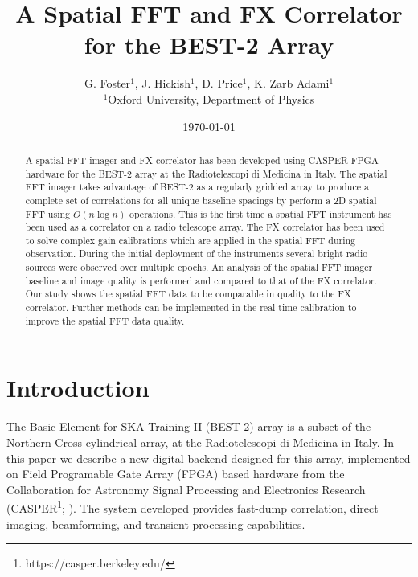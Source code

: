 \documentclass[useAMS,macros,usenatbib,onecolumn]{mn2e}
\title[]{A Spatial FFT and FX Correlator for the BEST-2 Array}
\author[G. Foster, J. Hickish, D. Price and K. Zarb Adami]{G. Foster$^{1}$, J. Hickish$^{1}$, D. Price$^{1}$, K. Zarb Adami$^{1}$\\
$^{1}$Oxford University, Department of Physics}
\begin{document}
\date{\today}

\pagerange{\pageref{firstpage}--\pageref{lastpage}} 

\maketitle

\begin{abstract}
A spatial FFT imager and FX correlator has been developed using CASPER FPGA hardware for the BEST-2 array at the Radiotelescopi di Medicina in Italy.
The spatial FFT imager takes advantage of BEST-2 as a regularly gridded array to produce a complete set of correlations for all unique baseline spacings by perform a 2D spatial FFT using $O(n \log n)$ operations.
This is the first time a spatial FFT instrument has been used as a correlator on a radio telescope array.
The FX correlator has been used to solve complex gain calibrations which are applied in the spatial FFT during observation.
During the initial deployment of the instruments several bright radio sources were observed over multiple epochs.
An analysis of the spatial FFT imager baseline and image quality is performed and compared to that of the FX correlator.
Our study shows the spatial FFT data to be comparable in quality to the FX correlator.
Further methods can be implemented in the real time calibration to improve the spatial FFT data quality.
\end{abstract}

\section{Introduction}

The Basic Element for SKA Training II (BEST-2) array is a subset of the Northern Cross cylindrical array, at the Radiotelescopi di Medicina in Italy.
In this paper we describe a new digital backend designed for this array, implemented on Field Programable Gate Array (FPGA) based hardware from the Collaboration for Astronomy Signal Processing and Electronics Research (CASPER\footnote{https://casper.berkeley.edu/}; \cite{casper}). The system developed provides fast-dump correlation, direct imaging, beamforming, and transient processing capabilities.
\end{document}
